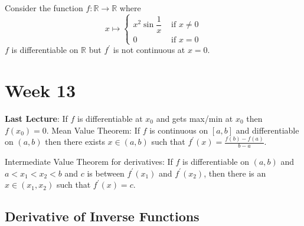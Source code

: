 \documentclass{report}
\begin{document}
\begin{examples}
    \begin{example}
        Consider the function $f : \mathbb{R} \rightarrow \mathbb{R}$ where 
            \begin{equation*}
                x \mapsto 
                    \begin{cases}
                        x^{2}\sin{\dfrac{1}{x}} & \text{ if $x \neq 0$} \\
                        0                       & \text{ if $x = 0$}      
                    \end{cases}
            \end{equation*}
        $f$ is differentiable on $\mathbb{R}$ but $f^{\prime}$ is not continuous at $x = 0$.
    \end{example}
\end{examples}

\chapter{Week 13}

\textbf{Last Lecture}: If $f$ is differentiable at $x_{0}$ and gets max/min at $x_{0}$ then $f(x_{0}) = 0$. Mean Value Theorem: If $f$ is continuous on $[a, b]$ and differentiable on $(a, b)$ then there exists $x \in (a, b)$ such that $f^{\prime}(x) = \frac{f(b) - f(a)}{b - a}$. 

Intermediate Value Theorem for derivatives: If $f$ is differentiable on $(a, b)$ and  $a < x_{1} < x_{2} < b$ and $c$ is between $f^{\prime}(x_{1})$ and $f^{\prime}(x_{2})$, then there is an $x \in (x_{1}, x_{2})$ such that $f^{\prime}(x) = c$.

\begin{topic}
    \section{Derivative of Inverse Functions}
\end{topic}
\end{document}
